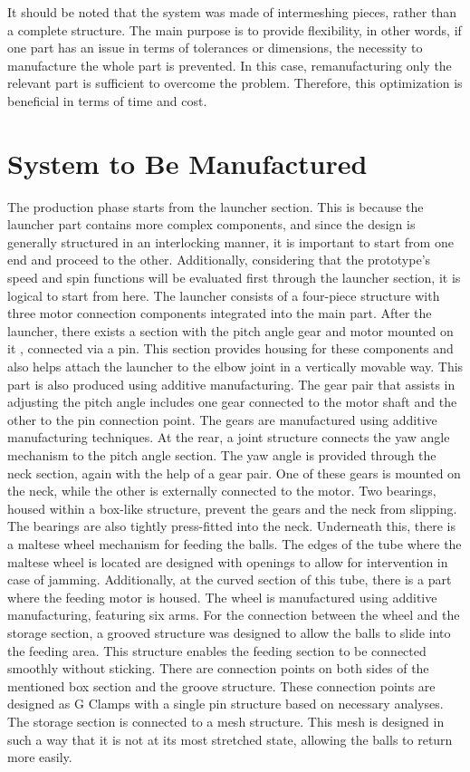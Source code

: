 \documentclass[12pt]{report}
\begin{document}
It should be noted that the system was made of intermeshing pieces, rather than a complete structure. The main purpose is to provide flexibility, in other words, if one part has an issue in terms of tolerances or dimensions, the necessity to manufacture the whole part is prevented. In this case, remanufacturing only the relevant part is sufficient to overcome the problem. Therefore, this optimization is beneficial in terms of time and cost.

\section{System to Be Manufactured}
The production phase starts from the launcher section. This is because the launcher part contains more complex components, and since the design is generally structured in an interlocking manner, it is important to start from one end and proceed to the other. Additionally, considering that the prototype’s speed and spin functions will be evaluated first through the launcher section, it is logical to start from here. The launcher consists of a four-piece structure with three motor connection components integrated into the main part.
After the launcher, there exists a section with the pitch angle gear and motor mounted on it , connected via a pin. This section provides housing for these components and also helps attach the launcher to the elbow joint in a vertically movable way. This part is also produced using additive manufacturing. The gear pair that assists in adjusting the pitch angle includes one gear connected to the motor shaft and the other to the pin connection point. The gears are manufactured using additive manufacturing techniques.
At the rear, a joint structure connects the yaw angle mechanism to the pitch angle section.
The yaw angle is provided through the neck section, again with the help of a gear pair. One of these gears is mounted on the neck, while the other is externally connected to the motor. Two bearings, housed within a box-like structure, prevent the gears and the neck from slipping. The bearings are also tightly press-fitted into the neck.
Underneath this, there is a maltese wheel mechanism for feeding the balls. The edges of the tube where the maltese wheel is located are designed with openings to allow for intervention in case of jamming. Additionally, at the curved section of this tube, there is a part where the feeding motor is housed. The wheel is manufactured using additive manufacturing, featuring six arms.
For the connection between the wheel and the storage section, a grooved structure was designed to allow the balls to slide into the feeding area. This structure enables the feeding
section to be connected smoothly without sticking. There are connection points on both sides of the mentioned box section and the groove structure. These connection points are designed as G Clamps with a single pin structure based on necessary analyses.
The storage section is connected to a mesh structure. This mesh is designed in such a way that it is not at its most stretched state, allowing the balls to return more easily.
\end{document}
